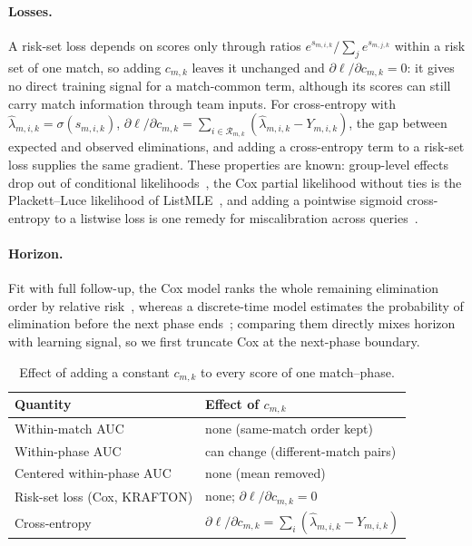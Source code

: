 \documentclass[sigconf,anonymous,nonacm]{acmart}
\begin{document}
\paragraph{Losses.}
A risk-set loss depends on scores only through ratios $e^{s_{m,i,k}}/\sum_{j}e^{s_{m,j,k}}$ within a risk set of one match, so adding $c_{m,k}$ leaves it unchanged and $\partial\ell/\partial c_{m,k}=0$: it gives no direct training signal for a match-common term, although its scores can still carry match information through team inputs. For cross-entropy with $\hat\lambda_{m,i,k}=\sigma(s_{m,i,k})$, $\partial\ell/\partial c_{m,k}=\sum_{i\in\mathcal{R}_{m,k}}(\hat\lambda_{m,i,k}-Y_{m,i,k})$, the gap between expected and observed eliminations, and adding a cross-entropy term to a risk-set loss supplies the same gradient. These properties are known: group-level effects drop out of conditional likelihoods~\cite{Chamberlain80}, the Cox partial likelihood without ties is the Plackett--Luce likelihood of ListMLE~\cite{Xia08}, and adding a pointwise sigmoid cross-entropy to a listwise loss is one remedy for miscalibration across queries~\cite{Bai23}.

\paragraph{Horizon.}
Fit with full follow-up, the Cox model ranks the whole remaining elimination order by relative risk~\cite{Cox72}, whereas a discrete-time model estimates the probability of elimination before the next phase ends~\cite{SingerWillett93,Gensheimer19}; comparing them directly mixes horizon with learning signal, so we first truncate Cox at the next-phase boundary.

\begin{table}[t]
\centering\footnotesize
\caption{Effect of adding a constant $c_{m,k}$ to every score of one match--phase.}
\label{tab:account}
\setlength{\tabcolsep}{3pt}
\begin{tabular}{ll}
\toprule
Quantity & Effect of $c_{m,k}$ \\
\midrule
Within-match AUC & none (same-match order kept) \\
Within-phase AUC & can change (different-match pairs) \\
Centered within-phase AUC & none (mean removed) \\
Risk-set loss (Cox, KRAFTON) & none; $\partial\ell/\partial c_{m,k}=0$ \\
Cross-entropy & $\partial\ell/\partial c_{m,k}=\sum_{i}(\hat\lambda_{m,i,k}-Y_{m,i,k})$ \\
\bottomrule
\end{tabular}
\end{table}
\end{document}
